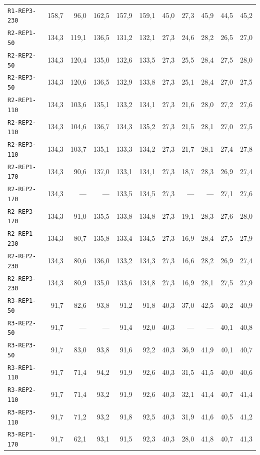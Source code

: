 \begin{longtable}{@{}lrrrrrrrrrr@{}}
\texttt{R1-REP3-230} & 158,7 & 96,0 & 162,5 & 157,9 & 159,1 & 45,0 & 27,3 & 45,9 & 44,5 & 45,2 \\
\texttt{R2-REP1-50} & 134,3 & 119,1 & 136,5 & 131,2 & 132,1 & 27,3 & 24,6 & 28,2 & 26,5 & 27,0 \\
\texttt{R2-REP2-50} & 134,3 & 120,4 & 135,0 & 132,6 & 133,5 & 27,3 & 25,5 & 28,4 & 27,5 & 28,0 \\
\texttt{R2-REP3-50} & 134,3 & 120,6 & 136,5 & 132,9 & 133,8 & 27,3 & 25,1 & 28,4 & 27,0 & 27,5 \\
\texttt{R2-REP1-110} & 134,3 & 103,6 & 135,1 & 133,2 & 134,1 & 27,3 & 21,6 & 28,0 & 27,2 & 27,6 \\
\texttt{R2-REP2-110} & 134,3 & 104,6 & 136,7 & 134,3 & 135,2 & 27,3 & 21,5 & 28,1 & 27,0 & 27,5 \\
\texttt{R2-REP3-110} & 134,3 & 103,7 & 135,1 & 133,3 & 134,2 & 27,3 & 21,7 & 28,1 & 27,4 & 27,8 \\
\texttt{R2-REP1-170} & 134,3 & 90,6 & 137,0 & 133,1 & 134,1 & 27,3 & 18,7 & 28,3 & 26,9 & 27,4 \\
\texttt{R2-REP2-170} & 134,3 & --- & --- & 133,5 & 134,5 & 27,3 & --- & --- & 27,1 & 27,6 \\
\texttt{R2-REP3-170} & 134,3 & 91,0 & 135,5 & 133,8 & 134,8 & 27,3 & 19,1 & 28,3 & 27,6 & 28,0 \\
\texttt{R2-REP1-230} & 134,3 & 80,7 & 135,8 & 133,4 & 134,5 & 27,3 & 16,9 & 28,4 & 27,5 & 27,9 \\
\texttt{R2-REP2-230} & 134,3 & 80,6 & 136,0 & 133,2 & 134,3 & 27,3 & 16,6 & 28,2 & 26,9 & 27,4 \\
\texttt{R2-REP3-230} & 134,3 & 80,9 & 135,0 & 133,6 & 134,8 & 27,3 & 16,9 & 28,1 & 27,5 & 27,9 \\
\texttt{R3-REP1-50} & 91,7 & 82,6 & 93,8 & 91,2 & 91,8 & 40,3 & 37,0 & 42,5 & 40,2 & 40,9 \\
\texttt{R3-REP2-50} & 91,7 & --- & --- & 91,4 & 92,0 & 40,3 & --- & --- & 40,1 & 40,8 \\
\texttt{R3-REP3-50} & 91,7 & 83,0 & 93,8 & 91,6 & 92,2 & 40,3 & 36,9 & 41,9 & 40,1 & 40,7 \\
\texttt{R3-REP1-110} & 91,7 & 71,4 & 94,2 & 91,9 & 92,6 & 40,3 & 31,5 & 41,5 & 40,0 & 40,6 \\
\texttt{R3-REP2-110} & 91,7 & 71,4 & 93,2 & 91,9 & 92,6 & 40,3 & 32,1 & 41,4 & 40,7 & 41,4 \\
\texttt{R3-REP3-110} & 91,7 & 71,2 & 93,2 & 91,8 & 92,5 & 40,3 & 31,9 & 41,6 & 40,5 & 41,2 \\
\texttt{R3-REP1-170} & 91,7 & 62,1 & 93,1 & 91,5 & 92,3 & 40,3 & 28,0 & 41,8 & 40,7 & 41,3 \\

\end{longtable}
